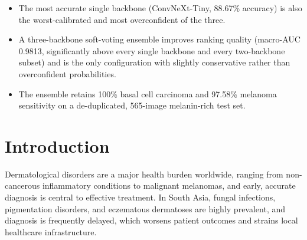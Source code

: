 \documentclass[VANCOUVER,twocolumn]{USG}
\begin{document}
\begin{itemize}
\item The most accurate single backbone (ConvNeXt-Tiny, 88.67\% accuracy) is also the worst-calibrated and most overconfident of the three.
\item A three-backbone soft-voting ensemble improves ranking quality (macro-AUC 0.9813, significantly above every single backbone and every two-backbone subset) and is the only configuration with slightly conservative rather than overconfident probabilities.
\item The ensemble retains 100\% basal cell carcinoma and 97.58\% melanoma sensitivity on a de-duplicated, 565-image melanin-rich test set.
\end{itemize}

\maketitle

\section{Introduction}\label{sec:intro}

Dermatological disorders are a major health burden worldwide, ranging from
non-cancerous inflammatory conditions to malignant melanomas, and early,
accurate diagnosis is central to effective treatment.
In South Asia, fungal infections, pigmentation disorders, and eczematous
dermatoses are highly prevalent, and diagnosis is frequently delayed, which
worsens patient outcomes and strains local healthcare infrastructure.
\end{document}

